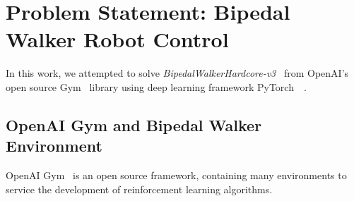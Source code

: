 \section{Problem Statement: Bipedal Walker Robot Control}
\label{sec:problem_statement}

In this work, we attempted to solve \textit{BipedalWalkerHardcore-v3}~\cite{noauthor_bipedalwalkerhardcore-v2_2021} from OpenAI's open source Gym~\cite{brockman_openai_2016} library using deep learning framework PyTorch~~\cite{paszke_pytorch_2019}.

\subsection{OpenAI Gym and Bipedal Walker Environment}
\label{ssec:gym_bipedal}

OpenAI Gym~\cite{brockman_openai_2016} is an open source framework, 
containing many environments to service the development of 
reinforcement learning algorithms. 

